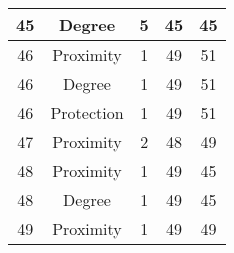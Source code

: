 \documentclass[results.tex]{subfiles}
\begin{document}
\begin{center}
\begin{tabular}{| c || c | c | c | c |}
    \hline
    45 & Degree & 5 & 45 & 45 \\ 
    \hline
    46 & Proximity & 1 & 49 & 51 \\ 
    \hline
    46 & Degree & 1 & 49 & 51 \\ 
    \hline
    46 & Protection & 1 & 49 & 51 \\ 
    \hline
    47 & Proximity & 2 & 48 & 49 \\ 
    \hline
    48 & Proximity & 1 & 49 & 45 \\ 
    \hline
    48 & Degree & 1 & 49 & 45 \\ 
    \hline
    49 & Proximity & 1 & 49 & 49 \\ 
    \hline   \end{tabular}
\end{center}
\end{document}
